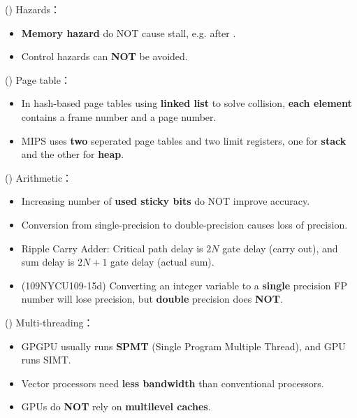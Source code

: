 \item \begin{theorem}{()} Hazards： \begin{itemize}
        \item \textbf{Memory hazard} do NOT cause stall, e.g.  after .
        \item Control hazards can \textbf{NOT} be avoided.
    \end{itemize}
\end{theorem}

\item \begin{theorem}{()} Page table： \begin{itemize}
        \item In hash-based page tables using \textbf{linked list} to solve collision, \textbf{each element} contains a frame number and a page number.
        \item MIPS uses \textbf{two} seperated page tables and two limit registers, one for \textbf{stack} and the other for \textbf{heap}.
    \end{itemize}
\end{theorem}

\item \begin{theorem}{()} Arithmetic： \begin{itemize}
        \item Increasing number of \textbf{used sticky bits} do NOT improve accuracy.
        \item Conversion from single-precision to double-precision causes loss of precision.
        \item Ripple Carry Adder: Critical path delay is $2N$ gate delay (carry out), and sum delay is $2N + 1$ gate delay (actual sum).
        \item (109NYCU109-15d) Converting an integer variable to a \textbf{single} precision FP number will lose precision, but \textbf{double} precision does \textbf{NOT}.
    \end{itemize}
\end{theorem}

\item \begin{theorem}{()} Multi-threading： \begin{itemize}
        \item GPGPU usually runs \textbf{SPMT} (Single Program Multiple Thread), and GPU runs SIMT.
        \item Vector processors need \textbf{less bandwidth} than conventional processors.
        \item GPUs do \textbf{NOT} rely on \textbf{multilevel caches}.
    \end{itemize}
\end{theorem}

